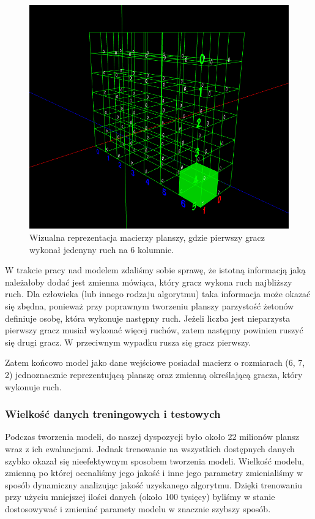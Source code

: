 \documentclass[12pt]{article}
\begin{document}
\begin{figure}[!ht]
    \centering
    \includegraphics[scale=0.40]{board.png}
    \caption{Wizualna reprezentacja macierzy planszy, gdzie pierwszy gracz wykonał jedenyny ruch na 6 kolumnie.}
\end{figure}

W trakcie pracy nad modelem zdaliśmy sobie sprawę, że istotną informacją jaką należałoby dodać jest zmienna mówiąca, który gracz wykona ruch najbliższy ruch. Dla człowieka (lub innego rodzaju algorytmu) taka informacja może okazać się zbędna, ponieważ przy poprawnym tworzeniu planszy parzystość żetonów definiuje osobę, która wykonuje następny ruch. Jeżeli liczba jest nieparzysta pierwszy gracz musiał wykonać więcej ruchów, zatem następny powinien ruszyć się drugi gracz. W przeciwnym wypadku rusza się gracz pierwszy.

Zatem końcowo model jako dane wejściowe posiadał macierz o rozmiarach (6, 7, 2) jednoznacznie reprezentującą planszę oraz zmienną określającą gracza, który wykonuje ruch.

\subsubsection{Wielkość danych treningowych i testowych}

Podczas tworzenia modeli, do naszej dyspozycji było około 22 milionów plansz wraz z ich ewaluacjami. Jednak trenowanie na wszystkich dostępnych danych szybko okazał się nieefektywnym sposobem tworzenia modeli. Wielkość modelu, zmienną po której ocenaliśmy jego jakość i inne jego parametry zmienialiśmy w sposób dynamiczny analizując jakość uzyskanego algorytmu. Dzięki trenowaniu przy użyciu mniejszej ilości danych (około 100 tysięcy) byliśmy w stanie dostosowywać i zmieniać paramety modelu w znacznie szybszy sposób.
\end{document}
